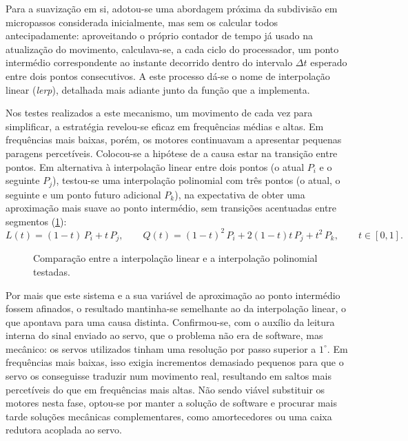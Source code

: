 Para a suavização em si, adotou-se uma abordagem próxima da subdivisão em micropassos considerada inicialmente, mas sem os calcular todos antecipadamente: aproveitando o próprio contador de tempo já usado na atualização do movimento, calculava-se, a cada ciclo do processador, um ponto intermédio correspondente ao instante decorrido dentro do intervalo \(\Delta t\) esperado entre dois pontos consecutivos. A este processo dá-se o nome de interpolação linear (\textit{lerp}), detalhada mais adiante junto da função que a implementa.

Nos testes realizados a este mecanismo, um movimento de cada vez para simplificar, a estratégia revelou-se eficaz em frequências médias e altas. Em frequências mais baixas, porém, os motores continuavam a apresentar pequenas paragens percetíveis. Colocou-se a hipótese de a causa estar na transição entre pontos. Em alternativa à interpolação linear entre dois pontos (o atual \(P_i\) e o seguinte \(P_j\)), testou-se uma interpolação polinomial com três pontos (o atual, o seguinte e um ponto futuro adicional \(P_k\)), na expectativa de obter uma aproximação mais suave ao ponto intermédio, sem transições acentuadas entre segmentos (\cref{fig:interpolacao-linear-poli}):
\[
L(t) = (1-t)\,P_i + t\,P_j, \qquad Q(t) = (1-t)^2\,P_i + 2(1-t)t\,P_j + t^2\,P_k, \qquad t \in [0,1].
\]

\begin{figure}[h]
  \centering
  \caption{Comparação entre a interpolação linear e a interpolação polinomial testadas.}
  \label{fig:interpolacao-linear-poli}
\end{figure}

Por mais que este sistema e a sua variável de aproximação ao ponto intermédio fossem afinados, o resultado mantinha-se semelhante ao da interpolação linear, o que apontava para uma causa distinta. Confirmou-se, com o auxílio da leitura interna do sinal enviado ao servo, que o problema não era de software, mas mecânico: os servos utilizados tinham uma resolução por passo superior a \(1^\circ\). Em frequências mais baixas, isso exigia incrementos demasiado pequenos para que o servo os conseguisse traduzir num movimento real, resultando em saltos mais percetíveis do que em frequências mais altas. Não sendo viável substituir os motores nesta fase, optou-se por manter a solução de software e procurar mais tarde soluções mecânicas complementares, como amortecedores ou uma caixa redutora acoplada ao servo.


